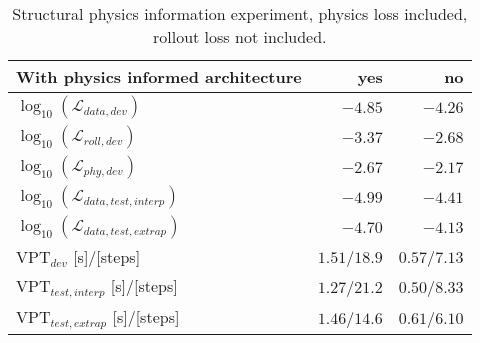 \begin{table}[!hb]
\centering
\caption{Structural physics information experiment, physics loss included, rollout loss not included.}
\label{tab:position_rotated_pinn_no_rollout}
\begin{tabular}{l|r|r|}
\textbf{With physics informed architecture} & \textbf{yes}  & \textbf{no}   \\ \hline
$\log_{10}(\mathcal{L}_{data,dev})$         & $\bm{-4.85}$  & $-4.26$       \\ \hline
$\log_{10}(\mathcal{L}_{roll,dev})$         & $\bm{-3.37}$  & $-2.68$       \\ \hline
$\log_{10}(\mathcal{L}_{phy,dev})$          & $\bm{-2.67}$  & $-2.17$       \\ \hline
$\log_{10}(\mathcal{L}_{data,test,interp})$ & $\bm{-4.99}$  & $-4.41$       \\ \hline
$\log_{10}(\mathcal{L}_{data,test,extrap})$ & $\bm{-4.70}$  & $-4.13$       \\ \hline
$\text{VPT}_{dev}$ [s]/[steps]              & $\bm{1.51}$/$18.9$ & $0.57$/$7.13$ \\ \hline
$\text{VPT}_{test,interp}$ [s]/[steps]      & $\bm{1.27}$/$21.2$ & $0.50$/$8.33$ \\ \hline
$\text{VPT}_{test,extrap}$ [s]/[steps]      & $\bm{1.46}$/$14.6$ & $0.61$/$6.10$
\end{tabular}
\end{table}